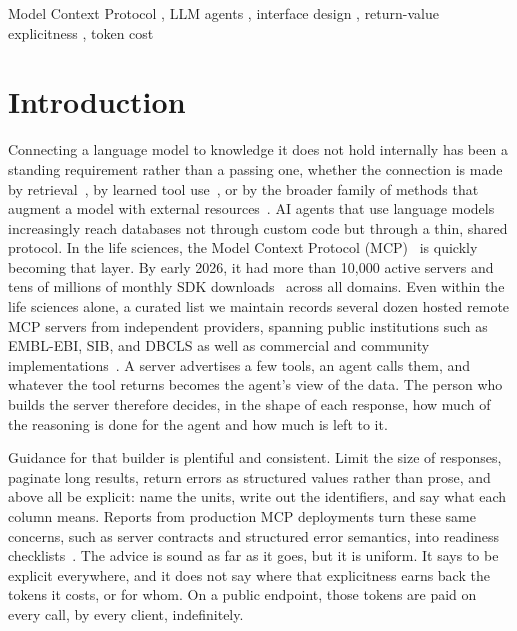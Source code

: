 \documentclass[sigconf]{ceurart}
\begin{document}
\begin{keywords}
  Model Context Protocol \sep
  LLM agents \sep
  interface design \sep
  return-value explicitness \sep
  token cost
\end{keywords}

\maketitle

\section{Introduction}

Connecting a language model to knowledge it does not hold internally has been a
standing requirement rather than a passing one, whether the connection is made by
retrieval~\cite{lewis2020rag}, by learned tool use~\cite{schick2023toolformer}, or
by the broader family of methods that augment a model with external
resources~\cite{mialon2023augmented}. AI agents that use language models
increasingly reach databases not through custom code but through a thin, shared
protocol. In the life sciences, the Model Context Protocol (MCP)~\cite{mcp2024spec}
is quickly becoming that layer. By early 2026, it had more than 10{,}000 active servers
and tens of millions of monthly SDK downloads~\cite{srinivasan2026bridging}
across all domains. Even within the life sciences alone, a curated list we maintain
records several dozen hosted remote MCP servers from independent providers, spanning
public institutions such as EMBL-EBI, SIB, and DBCLS as well as commercial and
community implementations~\cite{dbcls2026remotemcp}. A server advertises a few
tools, an agent calls them,
and whatever the tool returns becomes the agent's view of the data.
The person who builds the server therefore decides, in the shape of each response,
how much of the reasoning is done for the agent and how much is left to it.

Guidance for that builder is plentiful and consistent. Limit the size of
responses, paginate long results, return errors as structured values rather than
prose, and above all be explicit: name the units, write out the identifiers, and
say what each column means. Reports from production MCP deployments turn these same
concerns, such as server contracts and structured error semantics, into readiness
checklists~\cite{srinivasan2026bridging}. The advice is sound as far as it goes,
but it is uniform. It says to be explicit everywhere, and it does not say where
that explicitness earns back the tokens it costs, or for whom. On a public
endpoint, those tokens are paid on every call, by every client, indefinitely.
\end{document}
